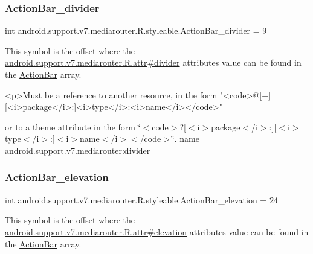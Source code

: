 \subsubsection{\texorpdfstring{Action\+Bar\+\_\+divider}{ActionBar\_divider}}
{\footnotesize\ttfamily int android.\+support.\+v7.\+mediarouter.\+R.\+styleable.\+Action\+Bar\+\_\+divider = 9\hspace{0.3cm}{\ttfamily [static]}}

This symbol is the offset where the \hyperlink{classandroid_1_1support_1_1v7_1_1mediarouter_1_1R_1_1attr_a8be8d169a154b716f3840650590a48f2}{android.\+support.\+v7.\+mediarouter.\+R.\+attr\#divider} attribute\textquotesingle{}s value can be found in the \hyperlink{classandroid_1_1support_1_1v7_1_1mediarouter_1_1R_1_1styleable_adc4d3c0d096085367f12d025007aa53f}{Action\+Bar} array.

\begin{DoxyVerb}      <p>Must be a reference to another resource, in the form "<code>@[+][<i>package</i>:]<i>type</i>:<i>name</i></code>"
\end{DoxyVerb}
 or to a theme attribute in the form \char`\"{}$<$code$>$?\mbox{[}$<$i$>$package$<$/i$>$\+:\mbox{]}\mbox{[}$<$i$>$type$<$/i$>$\+:\mbox{]}$<$i$>$name$<$/i$>$$<$/code$>$\char`\"{}.  name android.\+support.\+v7.\+mediarouter\+:divider \mbox{\label{classandroid_1_1support_1_1v7_1_1mediarouter_1_1R_1_1styleable_a1396d5d60613c38317526a6e7e72a56e}} 
\subsubsection{\texorpdfstring{Action\+Bar\+\_\+elevation}{ActionBar\_elevation}}
{\footnotesize\ttfamily int android.\+support.\+v7.\+mediarouter.\+R.\+styleable.\+Action\+Bar\+\_\+elevation = 24\hspace{0.3cm}{\ttfamily [static]}}

This symbol is the offset where the \hyperlink{classandroid_1_1support_1_1v7_1_1mediarouter_1_1R_1_1attr_ab1ec64066729d67ab6ae697dc2178d06}{android.\+support.\+v7.\+mediarouter.\+R.\+attr\#elevation} attribute\textquotesingle{}s value can be found in the \hyperlink{classandroid_1_1support_1_1v7_1_1mediarouter_1_1R_1_1styleable_adc4d3c0d096085367f12d025007aa53f}{Action\+Bar} array.

